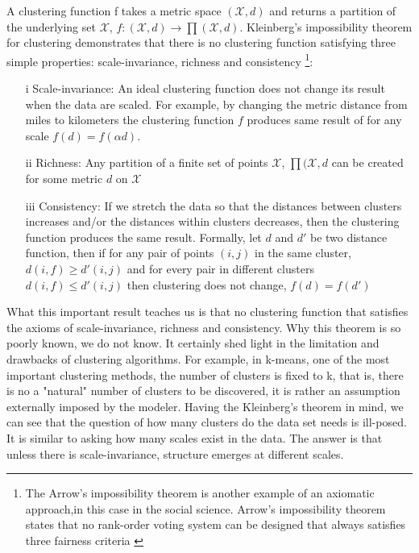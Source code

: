 \documentclass[onecollarge,runningheads]{svjour2}
\begin{document}
A clustering function f takes a metric space $(\mathcal{X},d)$ and returns a partition of the underlying set $\mathcal{X}$, $f:(\mathcal{X},d) \to \prod(\mathcal{X},d)$. Kleinberg's impossibility theorem for clustering demonstrates that there is no clustering function satisfying three simple properties: scale-invariance, richness and consistency \footnote{The Arrow's impossibility theorem is another example of an axiomatic approach,in this case in the social science. Arrow's impossibility theorem states that 
 no rank-order voting system can be designed that always satisfies three fairness criteria \cite{arrow1950difficulty}}:
\begin{enumerate}
\item[i] Scale-invariance: An ideal clustering function does not change its result when the data are scaled. For example, by changing the metric distance from miles to kilometers the clustering function $f$ produces same result of for any scale $ f(d) = f(\alpha d)$.
\item[ii] Richness: Any partition of a finite set of points $\mathcal{X}$, $\prod(\mathcal{X},d$ can be created for some metric $d$ on $\mathcal{X}$ 
\item[iii] Consistency:  If we stretch the data so that the distances between clusters increases and/or the distances within clusters decreases, then  the clustering function produces the same result. Formally, let $d$ and $d'$ be two distance function, then if for any pair of points $(i,j)$ in the same cluster,$d(i,f) \geq d'(i,j)$ and for every pair in different clusters $d(i,f) \leq d'(i,j)$ then clustering does not change, $f(d)= f(d')$
\end{enumerate}
What this important result teaches us is that no clustering function that satisfies the axioms of scale-invariance, richness and consistency.
Why this theorem is so poorly known, we do not know. It certainly shed light in the limitation and drawbacks of clustering algorithms. 
For example, in k-means, one of the most important clustering methods, the number of clusters is fixed to k, that is, there is no a "natural" number of clusters to be discovered, it is rather an assumption externally imposed by the modeler. Having the Kleinberg's theorem in mind, we can see that the question of how many clusters do the data set needs is ill-posed. It is similar to asking how many scales exist in the data. The answer is that unless there is  scale-invariance, structure emerges at different scales. 
\end{document}
